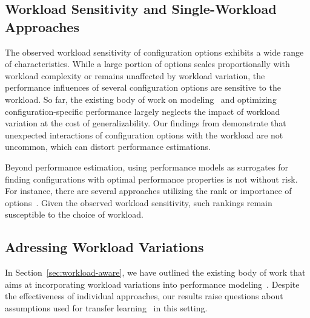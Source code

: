 {{{\subsection{Workload Sensitivity and Single-Workload Approaches}
The observed workload sensitivity of configuration options exhibits a wide range of characteristics. While a large portion of options scales proportionally with workload complexity or remains unaffected by workload variation, the performance influences of several configuration options are sensitive to the workload.  So far, the existing body of work on modeling~\cite{dorn2020,siegmundPerformanceinfluenceModelsHighly2015,haDeepPerf2019,perfAL,guoVariabilityawarePerformancePrediction2013,sarkarCostEfficientSamplingPerformance,guo_2018_data,fourier_learning_2015,perLasso} and optimizing~\cite{chen_mmo_2021,nairUsingBadLearners2017,nairFlash18,ohFindingNearoptimalConfigurations2017} configuration-specific performance largely neglects the impact of workload variation at the cost of generalizability. 
Our findings from  demonstrate that unexpected interactions of configuration options with the workload are not uncommon, which can distort performance estimations.

Beyond performance estimation, using performance models as surrogates for finding configurations with optimal performance properties is not without risk. For instance, there are several approaches utilizing the rank or importance of options~\cite{nairUsingBadLearners2017,ohFindingNearoptimalConfigurations2017}. Given the observed workload sensitivity, such rankings remain susceptible to the choice of workload.

\subsection{Adressing Workload Variations}
In Section~\ref{sec:workload-aware}, we have outlined the existing body of work that aims at incorporating workload variations into performance modeling~\cite{koc_satune_2021,jamishidi_transfer_2017,jamshidi_learning_2018,jamshidi_transfer_gp_2017}. Despite the effectiveness of individual approaches, our results raise questions about assumptions  used for transfer learning~\cite{jamshidi_learning_2018,jamishidi_transfer_2017} in this setting. 

}}}
